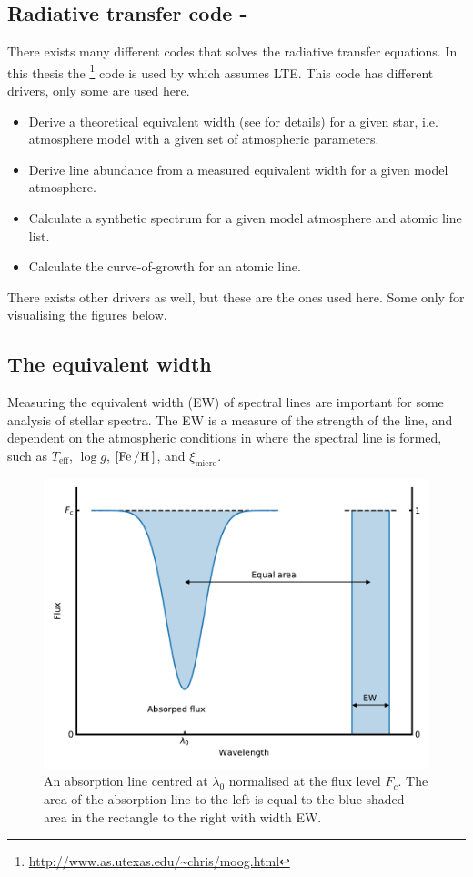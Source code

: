 {\subsection{Radiative transfer code - }

There exists many different codes that solves the radiative transfer equations. In this thesis the
\footnote{\url{http://www.as.utexas.edu/~chris/moog.html}} code is used by
\citet{Sneden1973} which assumes LTE. This code has different drivers, only some are used here.
\begin{itemize}
  \item Derive a theoretical equivalent width (see  for details) for a given star, i.e.
        atmosphere model with a given set of atmospheric parameters.
  \item Derive line abundance from a measured equivalent width for a given model atmosphere.
  \item Calculate a synthetic spectrum for a given model atmosphere and atomic line list.
  \item Calculate the curve-of-growth for an atomic line.
\end{itemize}
There exists other drivers as well, but these are the ones used here. Some only for visualising the
figures below.



\subsection{The equivalent width}
\label{sec:EW}

Measuring the equivalent width (EW) of spectral lines are important for some analysis of stellar
spectra. The EW is a measure of the strength of the line, and dependent on the atmospheric
conditions in where the spectral line is formed, such as $T_\mathrm{eff}$, $\log g$,
$[\ion{Fe}/\ion{H}]$, and $\xi_\mathrm{micro}$.

\begin{figure}[htpb!]
    \centering
    \includegraphics[width=0.85\linewidth]{figures/ewTheoretical.pdf}
    \caption{An absorption line centred at $\lambda_0$ normalised at the flux level $F_c$. The area
             of the absorption line to the left is equal to the blue shaded area in the rectangle to
             the right with width EW.}
    \label{fig:ewTheoretical}
\end{figure}

}
